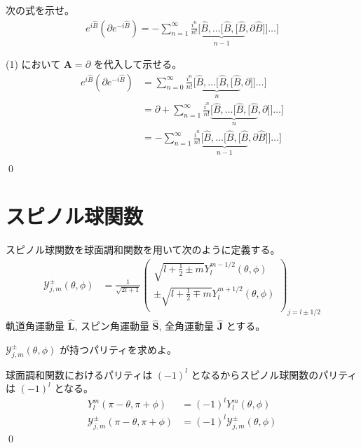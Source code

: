\documentclass[uplatex,dvipdfmx,a4paper,11pt]{jlreq}
\makeatletter
\newcommand{\BB}{\bm{B}}
\renewcommand{\AA}{\hat{A}}
\renewcommand{\BB}{\hat{B}}
\renewcommand{\AA}{\bm{A}}
\numberwithin{equation}{section}
\theoremstyle{definition}
\renewenvironment{proof}[1][\proofname]{\par
  \normalfont
  \topsep6\p@\@plus6\p@ \trivlist
  \item[\hskip\labelsep{\bfseries #1}\@addpunct{\bfseries}]\ignorespaces\quad\par
}{%
  \qed\endtrivlist\@endpefalse
}
\renewcommand\proofname{証明}
\makeatother
\begin{document}
\begin{problem}
次の式を示せ。
\begin{align}
  e^{i\BB}(\partial e^{-i\BB}) = -\sum_{n=1}^{\infty}\frac{i^n}{n!}\underbrace{[\BB, \ldots [\BB, [\BB}_{n-1}, \partial\BB]] \ldots]
\end{align}
\end{problem}
\begin{proof}
  (1) において $\AA = \partial$ を代入して示せる。
  \begin{align}
    e^{i\BB}(\partial e^{-i\BB}) & = \sum_{n=0}^{\infty}\frac{i^n}{n!}\underbrace{[\BB, \ldots [\BB, [\BB}_{n}, \partial]] \ldots]            \\
                                 & = \partial + \sum_{n=1}^{\infty}\frac{i^n}{n!}\underbrace{[\BB, \ldots [\BB, [\BB}_{n}, \partial]] \ldots] \\
                                 & = -\sum_{n=1}^{\infty}\frac{i^n}{n!}\underbrace{[\BB, \ldots [\BB, [\BB}_{n-1}, \partial\BB]] \ldots]      \\
  \end{align}
\end{proof}

\section{スピノル球関数}
\begin{problem}
スピノル球関数を球面調和関数を用いて次のように定義する。
\begin{align}
  \mathcal{Y}_{j, m}^\pm(\theta, \phi) & = \frac{1}{\sqrt{2l + 1}}\begin{pmatrix}
                                                                    \sqrt{l + \frac{1}{2} \pm m}Y_l^{m - 1/2}(\theta, \phi)    \\
                                                                    \pm\sqrt{l + \frac{1}{2} \mp m}Y_l^{m + 1/2}(\theta, \phi) \\
                                                                  \end{pmatrix}_{j = l\pm 1/2}
\end{align}
軌道角運動量 $\hat{\bm{L}}$, スピン角運動量 $\hat{\bm{S}}$, 全角運動量 $\hat{\bm{J}}$ とする。

$\mathcal{Y}_{j, m}^\pm(\theta, \phi)$ が持つパリティを求めよ。
\end{problem}
\begin{proof}
  球面調和関数におけるパリティは $(-1)^l$ となるからスピノル球関数のパリティは $(-1)^l$ となる。
  \begin{align}
    Y_l^m(\pi - \theta, \pi + \phi)                  & = (-1)^lY_l^m(\theta, \phi)                  \\
    \mathcal{Y}_{j, m}^\pm(\pi - \theta, \pi + \phi) & = (-1)^l\mathcal{Y}_{j, m}^\pm(\theta, \phi)
  \end{align}
\end{proof}
\end{document}
